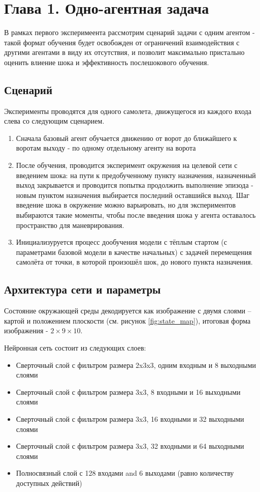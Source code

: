 \section{Глава 1. Одно-агентная задача}

В рамках первого эксперимеента рассмотрим сценарий задачи с одним агентом - такой формат обучения 
будет освобожден от ограничений взаимодействия с другими агентами в виду их отсутствия, 
и позволит максимально пристально оценить влиение шока и эффективность послешокового обучения.

\subsection{Сценарий}

Эксперименты проводятся для одного самолета, движущегося из каждого входа слева со следующим сценарием.

\begin{enumerate}
    \item Сначала базовый агент обучается движению от ворот до ближайшего к воротам выходу - 
		по одному отдельному агенту на ворота 
    \item После обучения, проводится эксперимент окружения на целевой сети с введением шока:
		на пути к предобученному пункту назначения, назначенный выход закрывается и проводится 
		попытка продолжить выполнение эпизода - новым пунктом назначения выбирается последний 
		оставшийся выход.
		Шаг введение шока в окружение можно варьировать, но для экспериментов выбираются такие моменты,
		чтобы после введения шока у агента оставалось пространство для маневрирования.
    \item Инициализуруется процесс дообучения модели с тёплым стартом (с параметрами базовой модели 
		в качестве начальных) с задачей перемещения самолёта от точки, в которой произошёл шок, до нового пункта назначения.
\end{enumerate}

\subsection{Архитектура сети и параметры}

Состояние окружающей среды декодируется как изображение с двумя слоями 
– картой и положением плоскости (см. рисунок \ref{fig:state_map}), 
итоговая форма изображения - $2 \times 9 \times 10$.

Нейронная сеть состоит из следующих слоев:

\begin{itemize}
    \item Сверточный слой с фильтром размера 2x3x3, одним входным и 8 выходными слоями 
    \item Сверточный слой с фильтром размера 3x3,  8 входными и 16 выходными слоями 
    \item Сверточный слой с фильтром размера 3x3, 16 входными и 32 выходными слоями 
    \item Сверточный слой с фильтром размера 3x3, 32 входными и 64 выходными слоями 
    \item Полносвязный слой с 128 входами and 6 выходами (равно количеству доступных действий)
\end{itemize}


